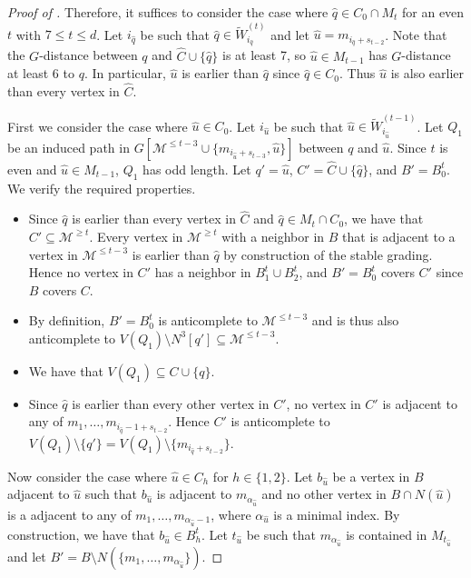 \documentclass{article}
\begin{document}
\begin{proof}[Proof of ]
Therefore, it suffices to consider the case where $\hat{q} \in C_0 \cap M_t$ for an even $t$ with $7 \leq t \leq d$. Let $i_{\hat{q}}$ be such that $\hat{q} \in \widetilde{W}^{(t)}_{i_{\hat{q}}}$ and let $\hat{u} = m_{i_{\hat{q}} + s_{t - 2}}$. 
Note that the $G$-distance between $q$ and $\widehat{C} \cup \{\hat{q}\}$ is at least 7, so $\hat{u} \in M_{t - 1}$ has $G$-distance at least 6 to $q$. In particular, $\hat{u}$ is earlier than $\hat{q}$ since $\hat{q} \in C_0$. Thus $\hat{u}$ is also earlier than every vertex in $\widehat{C}$.

First we consider the case where $\hat{u} \in C_0$. Let $i_{\hat{u}}$ be such that $\hat{u} \in \widetilde{W}^{(t - 1)}_{i_{\hat{u}}}$. 
Let $Q_1$ be an induced path in $G[\mathcal{M}^{\leq t - 3} \cup \{ m_{i_{\hat{u}} + s_{t - 3}}, \hat{u} \}]$ between $q$ and $\hat{u}$. Since $t$ is even and $\hat{u}\in M_{t - 1}$, $Q_1$ has odd length. Let $q' = \hat{u}$, $C' = \widehat{C} \cup \{\hat{q} \}$, and $B' = B_0^{t}$. We verify the required properties.

\begin{itemize}
    \item Since $\hat{q}$ is earlier than every vertex in $\widehat{C}$ and $\hat{q} \in M_t \cap C_0$, we have that $C' \subseteq \mathcal{M}^{\geq t}$. Every vertex in $\mathcal{M}^{\geq t}$ with a neighbor in $B$ that is adjacent to a vertex in $\mathcal{M}^{\leq t- 3}$ is earlier than $\hat{q}$ by construction of the stable grading. Hence no vertex in $C'$ has a neighbor in $B^t_1 \cup B^t_2$, and $B' = B^t_0$ covers $C'$ since $B$ covers $C$.
    \item By definition, $B' = B^t_0$ is anticomplete to $\mathcal{M}^{\leq t - 3}$ and is thus also anticomplete to $V(Q_1) \setminus N^3[q'] \subseteq \mathcal{M}^{\leq t - 3}$. 
    \item We have that $V(Q_1) \subseteq C \cup \{q\}$.
    \item Since $\hat{q}$ is earlier than every other vertex in $C'$, no vertex in $C'$ is adjacent to any of $m_1, \dots, m_{i_{\hat{q}} -1 + s_{t - 2}}$. Hence $C'$ is anticomplete to $V(Q_1) \setminus \{q'\} = V(Q_1) \setminus \{m_{i_{\hat{q}} + s_{t - 2}}\}$.
\end{itemize}

Now consider the case where $\hat{u} \in C_h$ for $h \in \{1, 2\}$.
Let $b_{\hat{u}}$ be a vertex in $B$ adjacent to $\hat{u}$ such that $b_{\hat{u}}$ is adjacent to $m_{\alpha_{\hat{u}}}$ and no other vertex in $B \cap N(\hat{u})$ is a adjacent to any of $m_1, \dots, m_{\alpha_{\hat{u}} - 1}$, where $\alpha_{\hat{u}}$ is a minimal index.
By construction, we have that $b_{\hat{u}} \in B^t_h$. Let $t_{\hat{u}}$ be such that $m_{\alpha_{\hat{u}}}$ is contained in $M_{t_{\hat{u}}}$ and let $B' = B \setminus N(\{ m_1, \dots, m_{\alpha_{\hat{u}}} \})$. 


\end{proof}
\end{document}

